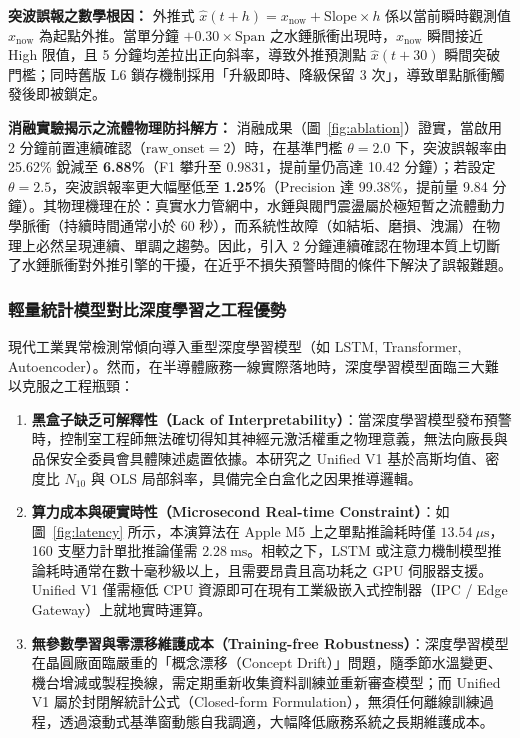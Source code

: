 \documentclass[fontset=none, a4paper, 12pt]{ctexart}
\begin{document}
\begin{doublespace}
\noindent\textbf{突波誤報之數學根因：}
外推式 $\hat{x}(t+h) = x_{\mathrm{now}} + \mathrm{Slope} \times h$ 係以當前瞬時觀測值 $x_{\mathrm{now}}$ 為起點外推。當單分鐘 $+0.30 \times \mathrm{Span}$ 之水錘脈衝出現時，$x_{\mathrm{now}}$ 瞬間接近 High 限值，且 5 分鐘均差拉出正向斜率，導致外推預測點 $\hat{x}(t+30)$ 瞬間突破門檻；同時舊版 L6 鎖存機制採用「升級即時、降級保留 3 次」，導致單點脈衝觸發後即被鎖定。

\noindent\textbf{消融實驗揭示之流體物理防抖解方：}
消融成果（圖~\ref{fig:ablation}）證實，當啟用 2 分鐘前置連續確認（$\text{raw\_onset} = 2$）時，在基準門檻 $\theta=2.0$ 下，突波誤報率由 25.62\% 銳減至 \textbf{6.88\%}（F1 攀升至 0.9831，提前量仍高達 10.42 分鐘）；若設定 $\theta=2.5$，突波誤報率更大幅壓低至 \textbf{1.25\%}（Precision 達 99.38\%，提前量 9.84 分鐘）。其物理機理在於：真實水力管網中，水錘與閥門震盪屬於極短暫之流體動力學脈衝（持續時間通常小於 60 秒），而系統性故障（如結垢、磨損、洩漏）在物理上必然呈現連續、單調之趨勢。因此，引入 2 分鐘連續確認在物理本質上切斷了水錘脈衝對外推引擎的干擾，在近乎不損失預警時間的條件下解決了誤報難題。

\subsubsection{輕量統計模型對比深度學習之工程優勢}
現代工業異常檢測常傾向導入重型深度學習模型（如 LSTM, Transformer, Autoencoder）。然而，在半導體廠務一線實際落地時，深度學習模型面臨三大難以克服之工程瓶頸：
\begin{enumerate}
    \item \textbf{黑盒子缺乏可解釋性（Lack of Interpretability）}：當深度學習模型發布預警時，控制室工程師無法確切得知其神經元激活權重之物理意義，無法向廠長與品保安全委員會具體陳述處置依據。本研究之 Unified V1 基於高斯均值、密度比 $N_{10}$ 與 OLS 局部斜率，具備完全白盒化之因果推導邏輯。
    \item \textbf{算力成本與硬實時性（Microsecond Real-time Constraint）}：如圖~\ref{fig:latency} 所示，本演算法在 Apple M5 上之單點推論耗時僅 \textbf{$13.54\ \mu\mathrm{s}$}，160 支壓力計單批推論僅需 \textbf{$2.28\ \mathrm{ms}$}。相較之下，LSTM 或注意力機制模型推論耗時通常在數十毫秒級以上，且需要昂貴且高功耗之 GPU 伺服器支援。Unified V1 僅需極低 CPU 資源即可在現有工業級嵌入式控制器（IPC / Edge Gateway）上就地實時運算。
    \item \textbf{無參數學習與零漂移維護成本（Training-free Robustness）}：深度學習模型在晶圓廠面臨嚴重的「概念漂移（Concept Drift）」問題，隨季節水溫變更、機台增減或製程換線，需定期重新收集資料訓練並重新審查模型；而 Unified V1 屬於封閉解統計公式（Closed-form Formulation），無須任何離線訓練過程，透過滾動式基準窗動態自我調適，大幅降低廠務系統之長期維護成本。
\end{enumerate}


\end{doublespace}
\end{document}
